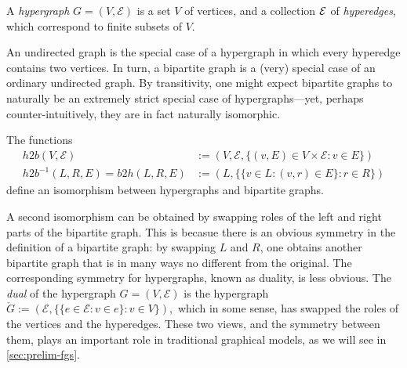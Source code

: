 \begin{defn}
    A \emph{hypergraph} $G = (V, \mathcal E)$ is a set $V$ of vertices,
    and a collection $\mathcal E$ of \emph{hyperedges}, which correspond to finite
    subsets of $V$. 
\end{defn}

An undirected graph is the special case of a hypergraph in which every hyperedge contains two vertices.
In turn, a bipartite graph is a (very) special case of an ordinary undirected graph.
By transitivity, one might expect bipartite graphs to naturally be an extremely strict special case of hypergraphs---yet, perhaps counter-intuitively, they are in fact naturally isomorphic. 

\begin{prop} 
The functions
\def\bigr{\mathit{h2b}}
\def\hygr{\mathit{b2h}}
\begin{align*}
    \bigr(V, \mathcal E) &:=  (V, \mathcal E, \{(v, E) \in V \times \mathcal E : v \in E \} ) \\
    \bigr^{-1}(L,R,E) = \hygr(L, R, E) &:= (L, \{\{v \in L : (v,r) \in E\} : r \in R\})
\end{align*}   
define an isomorphism between hypergraphs and bipartite graphs.
\end{prop}

A second isomorphism can be obtained by swapping roles of the left and right parts of the bipartite graph. 
This is becasue there is an obvious symmetry in the definition of a bipartite graph: 
by swapping $L$ and $R$, one
obtains another bipartite graph that is 
    in many ways no different from the original.
The corresponding symmetry for hypergraphs, known as duality, is less obvious.
%
The \emph{dual} of the hypergraph $G = (V, \mathcal E)$ is
the hypergraph
$
    \check G := (\mathcal E, \{\{e \in \mathcal E : v \in e\} : v \in V\}),
$
which in some sense, has swapped the roles of the vertices and the hyperedges.
These two views, and the symmetry between them, 
plays an important role in traditional graphical models, as we will see in \cref{sec:prelim-fgs}.

